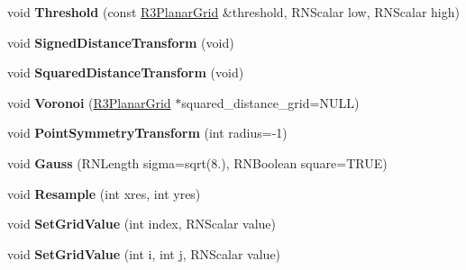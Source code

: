 \begin{DoxyCompactItemize}
\item 
void {\bfseries Threshold} (const \hyperlink{class_r3_planar_grid}{R3\+Planar\+Grid} \&threshold, R\+N\+Scalar low, R\+N\+Scalar high)\hypertarget{class_r3_planar_grid_a4245d8f362573d91efbe5ed4a2ca2019}{}\label{class_r3_planar_grid_a4245d8f362573d91efbe5ed4a2ca2019}

\item 
void {\bfseries Signed\+Distance\+Transform} (void)\hypertarget{class_r3_planar_grid_a2b34532fea14440043f45a7148aa814c}{}\label{class_r3_planar_grid_a2b34532fea14440043f45a7148aa814c}

\item 
void {\bfseries Squared\+Distance\+Transform} (void)\hypertarget{class_r3_planar_grid_a9c30ec7fc07f83e0923f00bf421fe51f}{}\label{class_r3_planar_grid_a9c30ec7fc07f83e0923f00bf421fe51f}

\item 
void {\bfseries Voronoi} (\hyperlink{class_r3_planar_grid}{R3\+Planar\+Grid} $\ast$squared\+\_\+distance\+\_\+grid=N\+U\+LL)\hypertarget{class_r3_planar_grid_ae3328dc279c1e2944856376c660823df}{}\label{class_r3_planar_grid_ae3328dc279c1e2944856376c660823df}

\item 
void {\bfseries Point\+Symmetry\+Transform} (int radius=-\/1)\hypertarget{class_r3_planar_grid_a2c13ab10a75c6b45d7d5f21d4f684623}{}\label{class_r3_planar_grid_a2c13ab10a75c6b45d7d5f21d4f684623}

\item 
void {\bfseries Gauss} (R\+N\+Length sigma=sqrt(8.), R\+N\+Boolean square=T\+R\+UE)\hypertarget{class_r3_planar_grid_a959c686334bfa310bdd3665a370a63d1}{}\label{class_r3_planar_grid_a959c686334bfa310bdd3665a370a63d1}

\item 
void {\bfseries Resample} (int xres, int yres)\hypertarget{class_r3_planar_grid_a6c7ce352c5a9bd0c0e444646182565b6}{}\label{class_r3_planar_grid_a6c7ce352c5a9bd0c0e444646182565b6}

\item 
void {\bfseries Set\+Grid\+Value} (int index, R\+N\+Scalar value)\hypertarget{class_r3_planar_grid_ac35d0bb8e5680cb080a2a708f2dd00eb}{}\label{class_r3_planar_grid_ac35d0bb8e5680cb080a2a708f2dd00eb}

\item 
void {\bfseries Set\+Grid\+Value} (int i, int j, R\+N\+Scalar value)\hypertarget{class_r3_planar_grid_a90ce8021c6f32e3f9e53277cde1a0da5}{}\label{class_r3_planar_grid_a90ce8021c6f32e3f9e53277cde1a0da5}


\end{DoxyCompactItemize}
